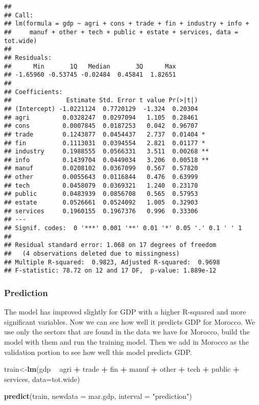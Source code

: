\documentclass[
]{article}
\newenvironment{Shaded}{\begin{snugshade}}{\end{snugshade}}
\newcommand{\DataTypeTok}[1]{\textcolor[rgb]{0.13,0.29,0.53}{#1}}
\newcommand{\KeywordTok}[1]{\textcolor[rgb]{0.13,0.29,0.53}{\textbf{#1}}}
\newcommand{\NormalTok}[1]{#1}
\newcommand{\OperatorTok}[1]{\textcolor[rgb]{0.81,0.36,0.00}{\textbf{#1}}}
\newcommand{\StringTok}[1]{\textcolor[rgb]{0.31,0.60,0.02}{#1}}
\begin{document}
\begin{verbatim}
## 
## Call:
## lm(formula = gdp ~ agri + cons + trade + fin + industry + info + 
##     manuf + other + tech + public + estate + services, data = tot.wide)
## 
## Residuals:
##      Min       1Q   Median       3Q      Max 
## -1.65960 -0.53745 -0.02484  0.45841  1.82651 
## 
## Coefficients:
##               Estimate Std. Error t value Pr(>|t|)   
## (Intercept) -1.0221124  0.7720129  -1.324  0.20304   
## agri         0.0328247  0.0297094   1.105  0.28461   
## cons         0.0007845  0.0187253   0.042  0.96707   
## trade        0.1243877  0.0454437   2.737  0.01404 * 
## fin          0.1113031  0.0394554   2.821  0.01177 * 
## industry     0.1988555  0.0566331   3.511  0.00268 **
## info         0.1439704  0.0449034   3.206  0.00518 **
## manuf        0.0208102  0.0367099   0.567  0.57820   
## other        0.0055643  0.0116844   0.476  0.63999   
## tech         0.0458079  0.0369321   1.240  0.23170   
## public       0.0483939  0.0856708   0.565  0.57953   
## estate       0.0526661  0.0524092   1.005  0.32903   
## services     0.1960155  0.1967376   0.996  0.33306   
## ---
## Signif. codes:  0 '***' 0.001 '**' 0.01 '*' 0.05 '.' 0.1 ' ' 1
## 
## Residual standard error: 1.068 on 17 degrees of freedom
##   (4 observations deleted due to missingness)
## Multiple R-squared:  0.9823, Adjusted R-squared:  0.9698 
## F-statistic: 78.72 on 12 and 17 DF,  p-value: 1.889e-12
\end{verbatim}

\hypertarget{prediction}{%
\subsubsection{Prediction}\label{prediction}}

The model has improved slightly for GDP with a higher R-squared and more
significant variables. Now we can see how well it predicts GDP for
Morocco. We use only the sectors that are found in the data we have for
Morocco, build the model with them and run the training model. Then we
add in Morocco as the validation portion to see how well this model
predicts GDP.

\begin{Shaded}
\begin{Highlighting}[]
\NormalTok{train<-}\KeywordTok{lm}\NormalTok{(gdp }\OperatorTok{~}\StringTok{ }\NormalTok{agri }\OperatorTok{+}\StringTok{ }\NormalTok{trade }\OperatorTok{+}\StringTok{ }\NormalTok{fin }\OperatorTok{+}\StringTok{ }\NormalTok{manuf }\OperatorTok{+}\StringTok{ }\NormalTok{other }\OperatorTok{+}\StringTok{ }\NormalTok{tech }\OperatorTok{+}\StringTok{ }\NormalTok{public }\OperatorTok{+}\StringTok{ }\NormalTok{services, }\DataTypeTok{data=}\NormalTok{tot.wide)}

\KeywordTok{predict}\NormalTok{(train, }\DataTypeTok{newdata =}\NormalTok{ mar.gdp, }\DataTypeTok{interval =} \StringTok{"prediction"}\NormalTok{)}
\end{Highlighting}
\end{Shaded}
\end{document}
